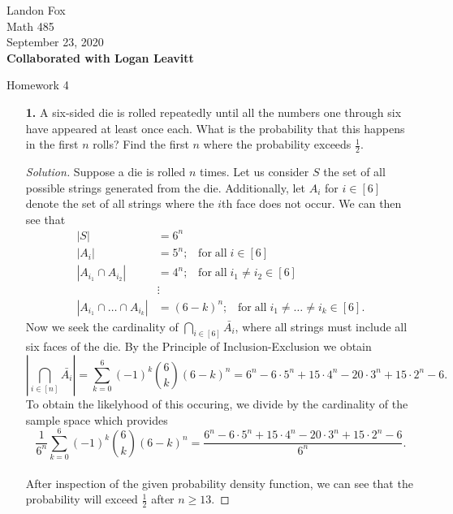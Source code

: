 \documentclass[ 12pt ]{article}
\begin{document}
\noindent Landon Fox \\
\noindent Math 485 \\
\noindent September 23, 2020 \\
\noindent \textbf{Collaborated with Logan Leavitt}

\begin{center}
	\Large Homework 4
\end{center}

\begin{enumerate}
	\item[\textbf{1.}] A six-sided die is rolled repeatedly until all the numbers one through six have appeared at least once each. What is the probability that this happens in the first
		$n$ rolls? Find the first $n$ where the probability exceeds $\frac{1}{2}$.

		\begin{proof}[Solution]
			Suppose a die is rolled $n$ times. Let us consider $S$ the set of all possible strings generated from the die. Additionally, let $A_i$ for $i \in [6]$ denote the set of all
			strings where the $i$th face does not occur. We can then see that
			\begin{align*}
				|S| &= 6^n \\
				|A_i| &= 5^n;\;\;\; \mathrm{for\; all}\; i \in [6] \\
				|A_{i_1} \cap A_{i_2}| &= 4^n;\;\;\; \mathrm{for\; all}\; i_1 \neq i_2 \in [6] \\
				&\vdots \\
				|A_{i_1} \cap \hdots \cap A_{i_k}| &= (6 - k)^n;\;\;\; \mathrm{for\; all}\; i_1 \neq \hdots \neq i_k \in [6].
			\end{align*}
			Now we seek the cardinality of $\bigcap_{i \in [6]} \bar{A_i}$, where all strings must include all six faces of the die. By the Principle of Inclusion-Exclusion
			we obtain $$\left | \bigcap_{i \in [n]} \bar{A_i} \right | = \sum_{k = 0}^6 (-1)^k \binom{6}{k} (6-k)^n = 6^n - 6 \cdot 5^n + 15 \cdot 4^n - 20 \cdot 3^n + 15 \cdot 2^n - 6.$$
			To obtain the likelyhood of this occuring, we divide by the cardinality of the sample space which provides $$\frac{1}{6^n} \sum_{k = 0}^6 (-1)^k \binom{6}{k} (6-k)^n =
			\frac{6^n - 6 \cdot 5^n + 15 \cdot 4^n - 20 \cdot 3^n + 15 \cdot 2^n - 6}{6^n}.$$ \\

			After inspection of the given probability density function, we can see that the probability will exceed $\frac{1}{2}$ after $n \geq 13$.
		\end{proof}



\end{enumerate}
\end{document}

